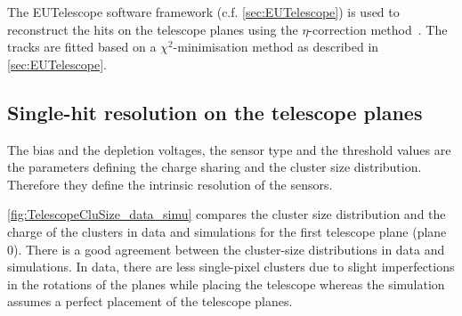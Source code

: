 The EUTelescope software framework (c.f. \cref{sec:EUTelescope}) is
used to reconstruct the hits on the telescope planes using the
$\eta$-correction method~\cite{Belau:1983eh}. The tracks are fitted
based on a $\chi^2$-minimisation method as described in
\cref{sec:EUTelescope}.

\subsection{Single-hit resolution on the telescope planes}

The bias and the depletion voltages, the sensor type and the threshold
values are the parameters defining the charge sharing and the cluster
size distribution. Therefore they define the intrinsic resolution of
the sensors.



\cref{fig:TelescopeCluSize_data_simu} compares the cluster size
distribution and the charge of the clusters in data and simulations
for the first telescope plane (plane 0). There is a good agreement
between the cluster-size distributions in data and simulations. In
data, there are less single-pixel clusters due to slight imperfections
in the rotations of the planes while placing the telescope whereas the
simulation assumes a perfect placement of the telescope planes.

